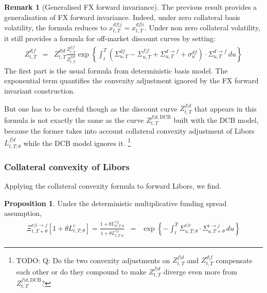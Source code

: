 \documentclass[11pt,english]{amsart}
\newcommand{\DCB}{\mathrm{DCB}}
\newcommand{\Q}{\Xi}
\theoremstyle{definition}
\newtheorem{prop}{Proposition}
\newtheorem{rema}{Remark}
\begin{document}
\begin{rema}[Generalised FX forward invariance]
The previous result provides a generalisation of FX forward invariance. Indeed, under zero collateral basis volatility, the formula reduces to $x^{df|j}_{t,T}= x^{df|i}_{t,T}$. Under non zero collateral volatility, it still provides a formula for off-market discount curves by setting:
\begin{eqnarray}
	Z^{d|f}_{t,T} &=& Z^{d|d}_{t,T} \frac{Z^{f|f}_{t,T}}{Z^{f|d}_{t,T}} 
	\exp\left\{ \int_t^T \left( \Sigma^{df}_{u,T} - \Sigma^{f|f}_{u,T} + \Sigma^{d\to f}_{u,T} + \sigma^{df}_u \right) \cdot \Sigma^{d\to f}_{u,T}\, du  \right\}
\end{eqnarray} 
The first part is the usual formula from deterministic basis model. The exponential term quantifies the convexity adjustment ignored by the FX forward invariant construction. 

But one has to be careful though as the discount curve $Z^{f|d}_{t,T}$ that appears in this formula is not exactly the same as the curve $Z^{f|d,\DCB}_{t,T}$ built with the DCB model, because the former takes into account collateral convexity adjustment of Libors $L^{f|d}_{t,T;\theta}$ while the DCB model ignores it. 
\footnote{TODO: Q: Do the two convexity adjustments on $Z^{f|d}_{t,T}$ and $Z^{d|f}_{t,T} $ compensate each other or do they compound to make $Z^{f|d}_{t,T}$ diverge even more from $Z^{f|d,\DCB}_{t,T}$?}
\end{rema}


 
\subsubsection{Collateral convexity of Libors}%

Applying the collateral convexity formula to forward Libors, we find.

\begin{prop}
Under the deterministic multiplicative funding spread assumption, 
\begin{eqnarray}
 \Q^{e|i\to j}_{t,T+\theta} \left[1+\theta L^{e}_{t,T;\theta} \right] 
 = \frac{1+\theta L^{e|j}_{S,T;\theta} }{ 1+\theta L^{e|i}_{t,T;\theta} }
 &=&  \exp\left\{  - \int_t^T \Sigma^{e|e}_{u,T;\theta}  \cdot  \Sigma^{i\to j}_{u,T+\theta}\, du \right\}
\end{eqnarray} 
\end{prop}


\end{document}
